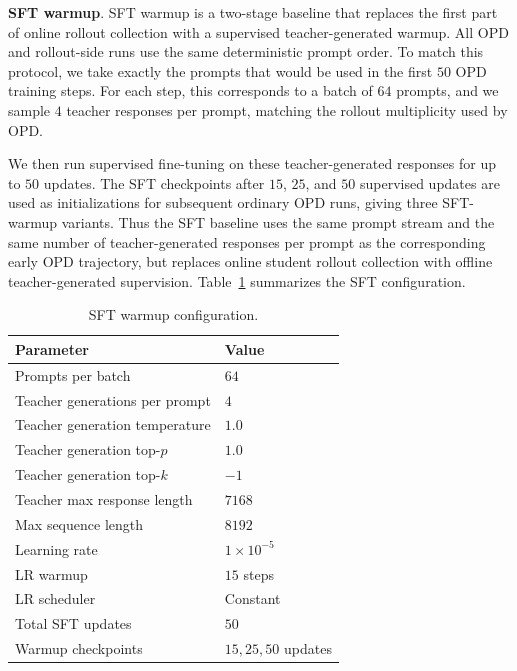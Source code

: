 \documentclass{llmxive}
\providecommand{\paragraph}[1]{\vspace{1mm}\noindent\textbf{#1}.}
\providecommand{\arraystretch}{1.14}
\begin{document}
\paragraph{SFT warmup}
SFT warmup is a two-stage baseline that replaces the first part of online rollout collection with a supervised teacher-generated warmup.
All OPD and rollout-side runs use the same deterministic prompt order.
To match this protocol, we take exactly the prompts that would be used in the first $50$ OPD training steps.
For each step, this corresponds to a batch of $64$ prompts, and we sample $4$ teacher responses per prompt, matching the rollout multiplicity used by OPD.

We then run supervised fine-tuning on these teacher-generated responses for up to $50$ updates.
The SFT checkpoints after $15$, $25$, and $50$ supervised updates are used as initializations for subsequent ordinary OPD runs, giving three SFT-warmup variants.
Thus the SFT baseline uses the same prompt stream and the same number of teacher-generated responses per prompt as the corresponding early OPD trajectory, but replaces online student rollout collection with offline teacher-generated supervision.
Table~\ref{tab:sft-warmup-hparams} summarizes the SFT configuration.

\begin{table}[t]
\centering
\small
\setlength{\tabcolsep}{6pt}
\renewcommand{\arraystretch}{1.1}
\begin{tabular}{@{}ll@{}}
\toprule
\textbf{Parameter} & \textbf{Value} \\
\midrule
Prompts per batch & $64$ \\
Teacher generations per prompt & $4$ \\
Teacher generation temperature & $1.0$ \\
Teacher generation top-$p$ & $1.0$ \\
Teacher generation top-$k$ & $-1$ \\
Teacher max response length & $7168$ \\
Max sequence length & $8192$ \\
Learning rate & $1 \times 10^{-5}$ \\
LR warmup & $15$ steps \\
LR scheduler & Constant \\
Total SFT updates & $50$ \\
Warmup checkpoints & $15, 25, 50$ updates \\
\bottomrule
\end{tabular}
\caption{SFT warmup configuration.}
\label{tab:sft-warmup-hparams}
\end{table}
\end{document}

